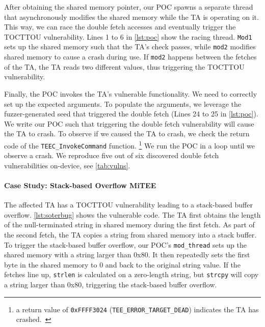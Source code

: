 \documentclass[conference]{IEEEtran}
\newcommand{\mitee}{MiTEE\xspace}
\newcommand{\numvulns}{six\xspace}
\newcommand{\numvulnsrepro}{five\xspace}
\begin{document}
After obtaining the shared memory pointer, 
our POC spawns a separate thread that asynchronously modifies the shared 
memory while the TA is operating on it. This way, we can race the 
double fetch accesses and eventually trigger the TOCTTOU vulnerability. 
Lines 1 to 6 in \autoref{lst:poc} show the racing thread. \texttt{Mod1} sets up the shared memory such that the TA's 
check passes, while \texttt{mod2} modifies shared memory to cause a crash during use.
If \texttt{mod2} happens between 
the fetches of the TA, the TA reads two different values, thus triggering 
the TOCTTOU vulnerability.

Finally, the POC invokes the TA's vulnerable functionality. We need to correctly 
set up the expected arguments. To populate the arguments, we leverage the fuzzer-generated 
seed that triggered the double fetch (Lines 24 to 25 in \autoref{lst:poc}).
We write our POC such that triggering the double fetch vulnerability will 
cause the TA to crash. To observe if we caused the TA to crash, we check the 
return code of the \texttt{TEEC\_InvokeCommand} function. \footnote{a return value of \texttt{0xFFFF3024} (\texttt{TEE\_ERROR\_TARGET\_DEAD}) indicates the TA has crashed.~\cite{gpintapi}}
We run the POC in a loop until we observe a crash. 
We reproduce \numvulnsrepro{} out of \numvulns{} discovered 
double fetch vulnerabilities on-device, see \autoref{tab:vulns}.

\paragraph{Case Study: Stack-based Overflow \mitee}

\begin{listing}[h]
    
    \label{lst:soterbug}
\end{listing}

The affected TA has a TOCTTOU vulnerability 
leading to a stack-based buffer overflow. \autoref{lst:soterbug} shows the vulnerable code. 
The TA first obtains the length of the null-terminated string in shared memory during the first 
fetch. As part of the second fetch, the TA copies a string from shared memory into a stack buffer. 
To trigger the stack-based buffer overflow, our POC's \texttt{mod\_thread} sets up the shared 
memory with a string larger than 0x80. It then repeatedly sets the 
first byte in the shared memory to 0 and back to the original string value. If the fetches 
line up, \texttt{strlen} is calculated on a zero-length string, but \texttt{strcpy} will 
copy a string larger than 0x80, triggering the stack-based buffer overflow.
\end{document}

